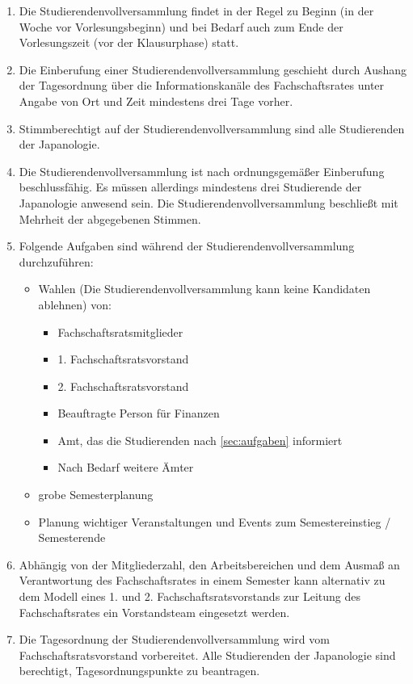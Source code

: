 \documentclass[12pt]{scrartcl}
\begin{document}
\begin{enumerate}
	\item Die Studierendenvollversammlung findet in der Regel zu Beginn (in der Woche vor Vorlesungsbeginn) und bei Bedarf auch zum Ende der Vorlesungszeit (vor der Klausurphase) statt.
	\item Die Einberufung einer Studierendenvollversammlung geschieht durch Aushang der Tagesordnung über die Informationskanäle des Fachschaftsrates unter Angabe von Ort und Zeit mindestens drei Tage vorher.
	\item Stimmberechtigt auf der Studierendenvollversammlung sind alle Studierenden der Japanologie.
	\item Die Studierendenvollversammlung ist nach ordnungsgemäßer Einberufung beschlussfähig. Es müssen allerdings mindestens drei Studierende der Japanologie anwesend sein. Die Studierendenvollversammlung beschließt mit Mehrheit der abgegebenen Stimmen.
	\item\label{par:assembly:tasks} Folgende Aufgaben sind während der Studierendenvollversammlung durchzuführen:
	\begin{itemize}
		\item Wahlen (Die Studierendenvollversammlung kann keine Kandidaten ablehnen) von:
		\begin{itemize}
			\item Fachschaftsratsmitglieder
			\item 1. Fachschaftsratsvorstand
			\item 2. Fachschaftsratsvorstand
			\item Beauftragte Person für Finanzen
			\item Amt, das die Studierenden nach \ref{sec:aufgaben} informiert
			\item Nach Bedarf weitere Ämter
		\end{itemize}
		\item grobe Semesterplanung
		\item Planung wichtiger Veranstaltungen und Events zum Semestereinstieg / Semesterende
	\end{itemize}
	\item Abhängig von der Mitgliederzahl, den Arbeitsbereichen und dem Ausmaß an Verantwortung des Fachschaftsrates in einem Semester kann alternativ zu dem Modell eines 1. und 2. Fachschaftsratsvorstands zur Leitung des Fachschaftsrates ein Vorstandsteam eingesetzt werden.
	\item Die Tagesordnung der Studierendenvollversammlung wird vom Fachschaftsratsvorstand vorbereitet. Alle Studierenden der Japanologie sind berechtigt, Tagesordnungspunkte zu beantragen.

\end{enumerate}
\end{document}
